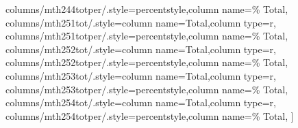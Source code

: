\documentclass[varwidth]{standalone}
\begin{document}
{    columns/mth244totper/.style={percentstyle,column name=\% Total},
    columns/mth251tot/.style={column name=Total,column type=r},
    columns/mth251totper/.style={percentstyle,column name=\% Total},
    columns/mth252tot/.style={column name=Total,column type=r},
    columns/mth252totper/.style={percentstyle,column name=\% Total},
    columns/mth253tot/.style={column name=Total,column type=r},
    columns/mth253totper/.style={percentstyle,column name=\% Total},
    columns/mth254tot/.style={column name=Total,column type=r},
    columns/mth254totper/.style={percentstyle,column name=\% Total},
]{\diversitydata}
}
\end{document}
